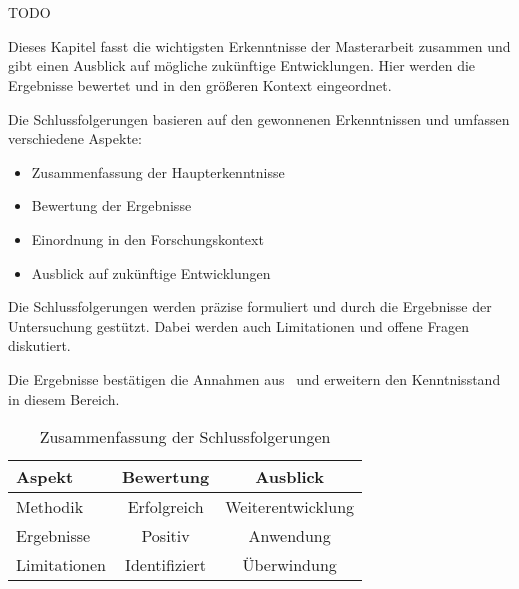 
\chapter{\conclusionLabel}\label{cha:conclusion}

TODO 

Dieses Kapitel fasst die wichtigsten Erkenntnisse der Masterarbeit zusammen und gibt einen Ausblick auf mögliche zukünftige Entwicklungen. 
Hier werden die Ergebnisse bewertet und in den größeren Kontext eingeordnet.

Die Schlussfolgerungen basieren auf den gewonnenen Erkenntnissen und umfassen verschiedene Aspekte:

\begin{itemize}[leftmargin=0.63cm, label=\textbullet]
    \item Zusammenfassung der Haupterkenntnisse
    \item Bewertung der Ergebnisse
    \item Einordnung in den Forschungskontext
    \item Ausblick auf zukünftige Entwicklungen
\end{itemize}

Die Schlussfolgerungen werden präzise formuliert und durch die Ergebnisse der Untersuchung gestützt. 
Dabei werden auch Limitationen und offene Fragen diskutiert.

Die Ergebnisse bestätigen die Annahmen aus~\cite{mustermann2023} und erweitern den Kenntnisstand in diesem Bereich.

\begin{table}[htbp]
    \centering
    \caption{Zusammenfassung der Schlussfolgerungen}
    \label{tab:schlussfolgerungen}
        \begin{tabular}{lcc}
        \toprule
        Aspekt & Bewertung & Ausblick \\
        \midrule
        Methodik & Erfolgreich & Weiterentwicklung \\
        Ergebnisse & Positiv & Anwendung \\
        Limitationen & Identifiziert & Überwindung \\
        \bottomrule
        \end{tabular}
\end{table}

